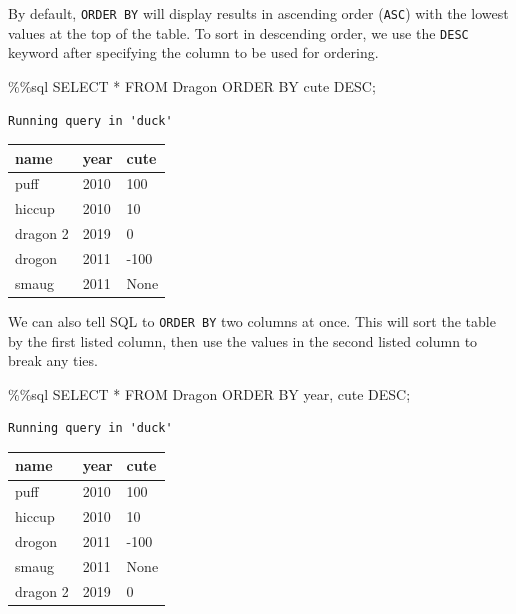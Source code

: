 \documentclass[
  letterpaper,
  DIV=11,
  numbers=noendperiod]{scrreprt}
\newenvironment{Shaded}{\begin{snugshade}}{\end{snugshade}}
\newcommand{\NormalTok}[1]{\textcolor[rgb]{0.00,0.23,0.31}{#1}}
\newcommand{\OperatorTok}[1]{\textcolor[rgb]{0.37,0.37,0.37}{#1}}
\begin{document}
By default, \texttt{ORDER\ BY} will display results in ascending order
(\texttt{ASC}) with the lowest values at the top of the table. To sort
in descending order, we use the \texttt{DESC} keyword after specifying
the column to be used for ordering.

\begin{Shaded}
\begin{Highlighting}[]
\OperatorTok{\%\%}\NormalTok{sql}
\NormalTok{SELECT }\OperatorTok{*}
\NormalTok{FROM Dragon}
\NormalTok{ORDER BY cute DESC}\OperatorTok{;}
\end{Highlighting}
\end{Shaded}

\begin{verbatim}
Running query in 'duck'
\end{verbatim}

\begin{longtable}[]{@{}lll@{}}
\toprule\noalign{}
name & year & cute \\
\midrule\noalign{}
\endhead
\bottomrule\noalign{}
\endlastfoot
puff & 2010 & 100 \\
hiccup & 2010 & 10 \\
dragon 2 & 2019 & 0 \\
drogon & 2011 & -100 \\
smaug & 2011 & None \\
\end{longtable}

We can also tell SQL to \texttt{ORDER\ BY} two columns at once. This
will sort the table by the first listed column, then use the values in
the second listed column to break any ties.

\begin{Shaded}
\begin{Highlighting}[]
\OperatorTok{\%\%}\NormalTok{sql}
\NormalTok{SELECT }\OperatorTok{*}
\NormalTok{FROM Dragon}
\NormalTok{ORDER BY year, cute DESC}\OperatorTok{;}
\end{Highlighting}
\end{Shaded}

\begin{verbatim}
Running query in 'duck'
\end{verbatim}

\begin{longtable}[]{@{}lll@{}}
\toprule\noalign{}
name & year & cute \\
\midrule\noalign{}
\endhead
\bottomrule\noalign{}
\endlastfoot
puff & 2010 & 100 \\
hiccup & 2010 & 10 \\
drogon & 2011 & -100 \\
smaug & 2011 & None \\
dragon 2 & 2019 & 0 \\
\end{longtable}
\end{document}
